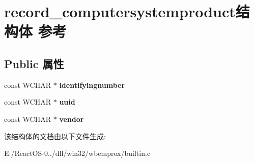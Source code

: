 \hypertarget{structrecord__computersystemproduct}{}\section{record\+\_\+computersystemproduct结构体 参考}
\label{structrecord__computersystemproduct}
\subsection*{Public 属性}
\begin{DoxyCompactItemize}
\item 
\mbox{\label{structrecord__computersystemproduct_a0afe7221d83f86e2e7660ea91c80c7a0}} 
const W\+C\+H\+AR $\ast$ {\bfseries identifyingnumber}
\item 
\mbox{\label{structrecord__computersystemproduct_aa70f46e4d0d52f11fb1979fb8a3a5b5a}} 
const W\+C\+H\+AR $\ast$ {\bfseries uuid}
\item 
\mbox{\label{structrecord__computersystemproduct_adffda674fe3fd220e0d7b4764e573c55}} 
const W\+C\+H\+AR $\ast$ {\bfseries vendor}
\end{DoxyCompactItemize}


该结构体的文档由以下文件生成\+:\begin{DoxyCompactItemize}
\item 
E\+:/\+React\+O\+S-\/0../dll/win32/wbemprox/builtin.\+c\end{DoxyCompactItemize}
